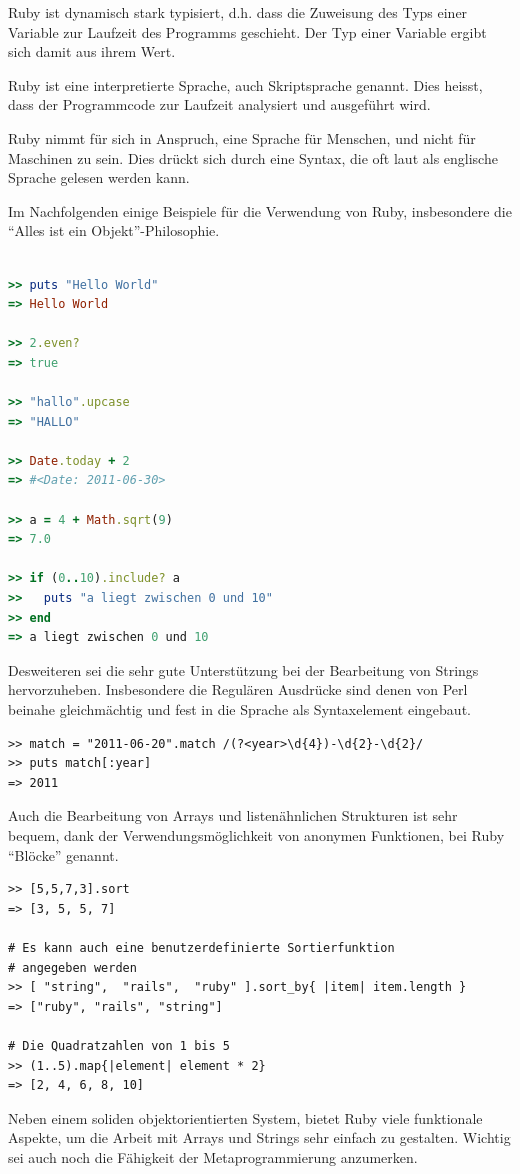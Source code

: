 Ruby ist dynamisch stark typisiert, d.h. dass die Zuweisung des Typs einer Variable zur Laufzeit des Programms geschieht. Der Typ einer Variable ergibt sich damit aus ihrem Wert.

Ruby ist eine interpretierte Sprache, auch Skriptsprache genannt. Dies heisst, dass der Programmcode zur Laufzeit analysiert und ausgeführt wird. 

Ruby nimmt für sich in Anspruch, eine Sprache für Menschen, und nicht für Maschinen zu sein. Dies drückt sich durch eine Syntax, die oft laut als englische Sprache gelesen werden kann. 

\setlength{\epigraphwidth}{\marginparwidth}
\setlength{\epigraphwidth}{0.8\textwidth}

Im Nachfolgenden einige Beispiele für die Verwendung von Ruby, insbesondere die "`Alles ist ein Objekt"'-Philosophie.

\begin{lstlisting}[language=Ruby,label=Ruby Beispiele,caption=Ruby Beispiele]
 
>> puts "Hello World"
=> Hello World

>> 2.even?
=> true

>> "hallo".upcase
=> "HALLO"

>> Date.today + 2
=> #<Date: 2011-06-30>

>> a = 4 + Math.sqrt(9)
=> 7.0

>> if (0..10).include? a
>>   puts "a liegt zwischen 0 und 10"
>> end
=> a liegt zwischen 0 und 10

\end{lstlisting}

Desweiteren sei die sehr gute Unterstützung bei der Bearbeitung von Strings hervorzuheben. Insbesondere die Regulären Ausdrücke sind denen von Perl beinahe gleichmächtig und fest in die Sprache als Syntaxelement eingebaut.

\begin{lstlisting}
>> match = "2011-06-20".match /(?<year>\d{4})-\d{2}-\d{2}/
>> puts match[:year]
=> 2011
\end{lstlisting}

Auch die Bearbeitung von Arrays und listenähnlichen Strukturen ist sehr bequem, dank der Verwendungsmöglichkeit von anonymen Funktionen, bei Ruby "`Blöcke"' genannt.

\begin{lstlisting}
>> [5,5,7,3].sort
=> [3, 5, 5, 7]

# Es kann auch eine benutzerdefinierte Sortierfunktion
# angegeben werden
>> [ "string",  "rails",  "ruby" ].sort_by{ |item| item.length }
=> ["ruby", "rails", "string"]

# Die Quadratzahlen von 1 bis 5
>> (1..5).map{|element| element * 2}
=> [2, 4, 6, 8, 10]
\end{lstlisting}
Neben einem soliden objektorientierten System, bietet Ruby viele funktionale Aspekte, um die Arbeit mit Arrays und Strings sehr einfach zu gestalten. Wichtig sei auch noch die Fähigkeit der Metaprogrammierung anzumerken.


